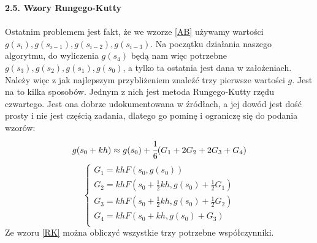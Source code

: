 \documentclass[a4paper]{article}
\begin{document}
\large
\textbf{2.5. Wzory Rungego-Kutty}\\\\
\normalsize
Ostatnim problemem jest fakt, że we wzorze \eqref{AB} używamy wartości $g(s_i), g(s_{i-1}), g(s_{i-2}), g(s_{i-3})$. Na początku działania naszego algorytmu, do wyliczenia $g(s_4)$ będą nam więc potrzebne $g(s_3), g(s_2), g(s_1), g(s_0)$, a tylko ta ostatnia jest dana w założeniach. Należy więc z jak najlepszym przybliżeniem znaleźć trzy pierwsze wartości $g$. Jest na to kilka sposobów. Jednym z nich jest metoda Rungego-Kutty rzędu czwartego. \cite{KI} \cite{WI} Jest ona dobrze udokumentowana w źródłach, a jej dowód jest dość prosty i nie jest częścią zadania, dlatego go pominę i ograniczę się do podania wzorów:
\begin{equation}\label{RK}
g(s_0 + kh) \approx g(s_0) + \cfrac{1}{6}(G_1 + 2G_2 + 2G_3 + G_4)
\end{equation}
$$\begin{cases}
G_1 = khF(s_0, g(s_0))\\
G_2 = khF(s_0 + \frac{1}{2}kh, g(s_0) + \frac{1}{2}G_1)\\
G_3 = khF(s_0 + \frac{1}{2}kh, g(s_0) + \frac{1}{2}G_2)\\
G_4 = khF(s_0 + kh, g(s_0) + G_3)\\
\end{cases}$$
Ze wzoru \eqref{RK} można obliczyć wszystkie trzy potrzebne współczynniki.\\\\
\end{document}
